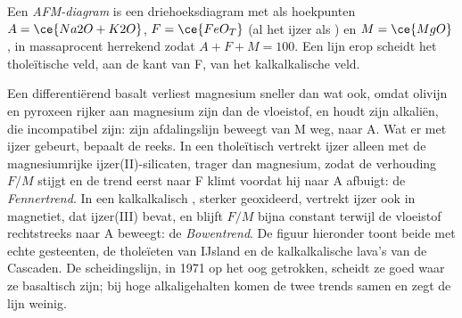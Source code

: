 \begin{definition}\label{def:b2:magmatic-series:afm}
Een \emph{AFM-diagram} is een driehoeksdiagram met als hoekpunten
$A = \ce{Na2O + K2O}$, $F = \ce{FeO_T}$ (al het ijzer als ) en $M = \ce{MgO}$, in
massaprocent herrekend zodat $A + F + M = 100$. Een lijn erop scheidt het
tholeïtische veld, aan de kant van F, van het kalkalkalische veld.
\end{definition}

Een differentiërend basalt verliest magnesium sneller dan wat ook, omdat olivijn en
pyroxeen rijker aan magnesium zijn dan de vloeistof, en houdt zijn alkaliën, die
incompatibel zijn: zijn afdalingslijn beweegt van M weg, naar A. Wat er met
ijzer gebeurt, bepaalt de reeks. In een tholeïtisch  vertrekt ijzer alleen met de
magnesiumrijke ijzer(II)-silicaten, trager dan magnesium, zodat de verhouding
$F/M$ stijgt en de trend eerst naar F klimt voordat hij naar A afbuigt: de
\emph{Fennertrend}. In een kalkalkalisch , sterker geoxideerd, vertrekt ijzer ook in
magnetiet, dat ijzer(III) bevat, en blijft $F/M$ bijna constant terwijl de vloeistof
rechtstreeks naar A beweegt: de \emph{Bowentrend}. De figuur hieronder toont beide met
echte gesteenten, de tholeïeten van IJsland en de kalkalkalische lava's van de Cascaden. De
scheidingslijn, in 1971 op het oog getrokken, scheidt ze goed waar ze basaltisch zijn; bij
hoge alkaligehalten komen de twee trends samen en zegt de lijn weinig.

